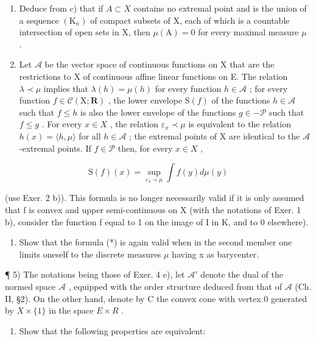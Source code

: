 \begin{enumerate}
\item
  Deduce from c) that if \(A \subset X\) contains no extremal point and is the union of a sequence \((\mathrm{K}_{n})\) of compact subsets of X, each of which is a countable intersection of open sets in X, then \(\mu(\mathrm{A}) = 0\) for every maximal measure \(\mu\) .
\item
  Let \(\mathcal{A}\) be the vector space of continuous functions on X that are the restrictions to X of continuous affine linear functions on E. The relation \(\lambda \prec \mu\) implies that \(\lambda(h) = \mu(h)\) for every function \(h \in \mathcal{A}\) ; for every function \(f \in \mathcal{C}(\mathrm{X};\mathbf{R})\) , the lower envelope \(\mathrm{S}(f)\) of the functions \(h \in \mathcal{A}\) such that \(f \leqslant h\) is also the lower envelope of the functions \(g \in -\mathcal{P}\) such that \(f \leqslant g\) . For every \(x \in X\) , the relation \(\varepsilon_x \prec \mu\) is equivalent to the relation \(h(x) = \langle h, \mu \rangle\) for all \(h \in \mathcal{A}\) ; the extremal points of X are identical to the \(\mathcal{A}\) -extremal points. If \(f \in \mathcal{P}\) then, for every \(x \in X\) ,
\end{enumerate}

\[
\mathrm{S} (f) (x) = \sup _ {\varepsilon_ {x} \prec \mu} \int f (y) d \mu (y)\tag{*}
\]

(use Exer. 2 b)). This formula is no longer necessarily valid if it is only assumed that f is convex and upper semi-continuous on X (with the notations of Exer. 1 b), consider the function f equal to 1 on the image of I in K, and to 0 elsewhere).

\begin{enumerate}
\def\labelenumi{\alph{enumi})}
\setcounter{enumi}{5}
\tightlist
\item
  Show that the formula (*) is again valid when in the second member one limits oneself to the discrete measures \(\mu\) having x as barycenter.
\end{enumerate}

¶ 5) The notations being those of Exer. 4 e), let \(\mathcal{A}'\) denote the dual of the normed space \(\mathcal{A}\) , equipped with the order structure deduced from that of \(\mathcal{A}\) (Ch. II, §2). On the other hand, denote by C the convex cone with vertex 0 generated by \(X \times \{1\}\) in the space \(E \times R\) .

\begin{enumerate}
\def\labelenumi{\alph{enumi})}
\tightlist
\item
  Show that the following properties are equivalent:
\end{enumerate}

